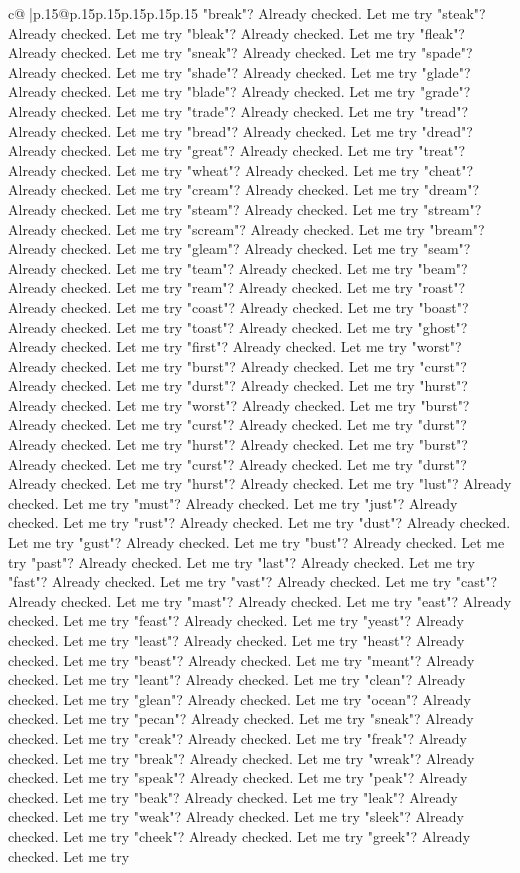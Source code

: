 \documentclass{article}
\begin{document}
{\begin{supertabular}{c@{$\;$}|p{.15\linewidth}@{}p{.15\linewidth}p{.15\linewidth}p{.15\linewidth}p{.15\linewidth}p{.15\linewidth}}
{{{"break"? Already checked. Let me try "steak"? Already checked. Let me try "bleak"? Already checked. Let me try "fleak"? Already checked. Let me try "sneak"? Already checked. Let me try "spade"? Already checked. Let me try "shade"? Already checked. Let me try "glade"? Already checked. Let me try "blade"? Already checked. Let me try "grade"? Already checked. Let me try "trade"? Already checked. Let me try "tread"? Already checked. Let me try "bread"? Already checked. Let me try "dread"? Already checked. Let me try "great"? Already checked. Let me try "treat"? Already checked. Let me try "wheat"? Already checked. Let me try "cheat"? Already checked. Let me try "cream"? Already checked. Let me try "dream"? Already checked. Let me try "steam"? Already checked. Let me try "stream"? Already checked. Let me try "scream"? Already checked. Let me try "bream"? Already checked. Let me try "gleam"? Already checked. Let me try "seam"? Already checked. Let me try "team"? Already checked. Let me try "beam"? Already checked. Let me try "ream"? Already checked. Let me try "roast"? Already checked. Let me try "coast"? Already checked. Let me try "boast"? Already checked. Let me try "toast"? Already checked. Let me try "ghost"? Already checked. Let me try "first"? Already checked. Let me try "worst"? Already checked. Let me try "burst"? Already checked. Let me try "curst"? Already checked. Let me try "durst"? Already checked. Let me try "hurst"? Already checked. Let me try "worst"? Already checked. Let me try "burst"? Already checked. Let me try "curst"? Already checked. Let me try "durst"? Already checked. Let me try "hurst"? Already checked. Let me try "burst"? Already checked. Let me try "curst"? Already checked. Let me try "durst"? Already checked. Let me try "hurst"? Already checked. Let me try "lust"? Already checked. Let me try "must"? Already checked. Let me try "just"? Already checked. Let me try "rust"? Already checked. Let me try "dust"? Already checked. Let me try "gust"? Already checked. Let me try "bust"? Already checked. Let me try "past"? Already checked. Let me try "last"? Already checked. Let me try "fast"? Already checked. Let me try "vast"? Already checked. Let me try "cast"? Already checked. Let me try "mast"? Already checked. Let me try "east"? Already checked. Let me try "feast"? Already checked. Let me try "yeast"? Already checked. Let me try "least"? Already checked. Let me try "heast"? Already checked. Let me try "beast"? Already checked. Let me try "meant"? Already checked. Let me try "leant"? Already checked. Let me try "clean"? Already checked. Let me try "glean"? Already checked. Let me try "ocean"? Already checked. Let me try "pecan"? Already checked. Let me try "sneak"? Already checked. Let me try "creak"? Already checked. Let me try "freak"? Already checked. Let me try "break"? Already checked. Let me try "wreak"? Already checked. Let me try "speak"? Already checked. Let me try "peak"? Already checked. Let me try "beak"? Already checked. Let me try "leak"? Already checked. Let me try "weak"? Already checked. Let me try "sleek"? Already checked. Let me try "cheek"? Already checked. Let me try "greek"? Already checked. Let me try }}}
\end{supertabular}}
\end{document}
